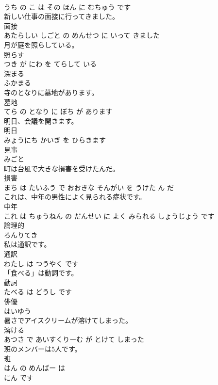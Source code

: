 \documentclass[8pt]{extreport}
\begin{document}
\begin{CJK}{UTF8}{min}
\\	うち の こ は その ほん に むちゅう です			
\\	新しい仕事の面接に行ってきました。	
\\	面接 
\\	あたらしい しごと の めんせつ に いって きました			
\\	月が庭を照らしている。	
\\	照らす 
\\	つき が にわ を てらして いる			
\\	深まる	
\\	ふかまる			
\\	寺のとなりに墓地があります。	
\\	墓地 
\\	てら の となり に ぼち が あります			
\\	明日、会議を開きます。	
\\	明日 
\\	みょうにち かいぎ を ひらきます			
\\	見事	
\\	みごと			
\\	町は台風で大きな損害を受けたんだ。	
\\	損害 
\\	まち は たいふう で おおきな そんがい を うけた ん だ			
\\	これは、中年の男性によく見られる症状です。	
\\	中年 
\\	これ は ちゅうねん の だんせい に よく みられる しょうじょう です			
\\	論理的	
\\	ろんりてき			
\\	私は通訳です。	
\\	通訳 
\\	わたし は つうやく です			
\\	「食べる」は動詞です。	
\\	動詞 
\\	たべる は どうし です			
\\	俳優	
\\	はいゆう			
\\	暑さでアイスクリームが溶けてしまった。	
\\	溶ける 
\\	あつさ で あいすくりーむ が とけて しまった			
\\	班のメンバーは5人です。	
\\	班 
\\	はん の めんばー は 
\\	にん です			

\end{CJK}
\end{document}
